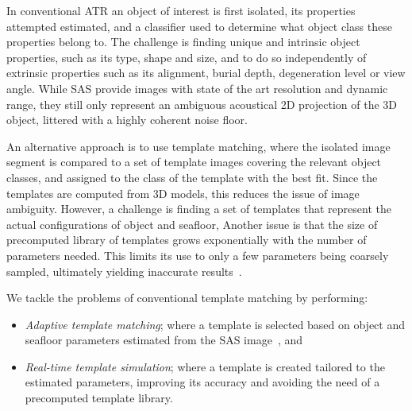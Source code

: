 
In conventional ATR an object of interest is first isolated, its properties attempted estimated, and a classifier used to determine what object class these properties belong to. The challenge is finding unique and intrinsic object properties, such as its type, shape and size, and to do so independently of extrinsic properties such as its alignment, burial depth, degeneration level or view angle. While SAS provide images with state of the art resolution and dynamic range, they still only represent an ambiguous acoustical 2D projection of the 3D object, littered with a highly coherent noise floor. 

An alternative approach is to use template matching, where the isolated image segment is compared to a set of template images covering the relevant object classes, and assigned to the class of the template with the best fit. Since the templates are computed from 3D models, this reduces the issue of image ambiguity. However, a challenge is finding a set of templates that represent the actual configurations of object and seafloor, Another issue is that the size of precomputed library of templates grows exponentially with the number of parameters needed. This limits its use to only a few parameters being coarsely sampled, ultimately yielding inaccurate results~\cite{Midelfart2010}.



We tackle the problems of conventional template matching by performing:
%
\begin{itemize}
\item \emph{Adaptive template matching}; where a template is selected based on object and seafloor parameters estimated from the SAS image~\cite{Midelfart2010}, and
\item \emph{Real-time template simulation}; where a template is created tailored to the estimated parameters, improving its accuracy and avoiding the need of a precomputed template library.
\end{itemize}
%

